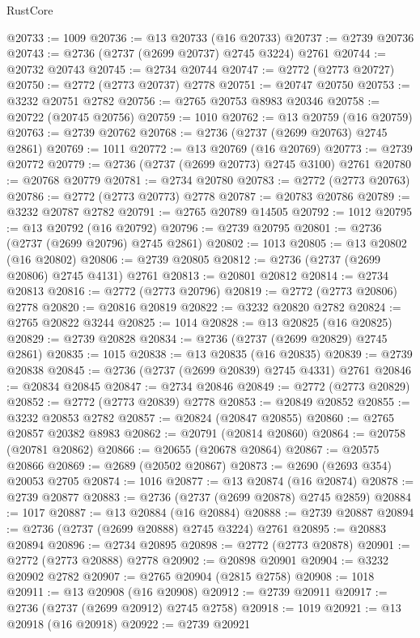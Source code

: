 \begin{lexlean}{RustCore}
\begin{coremodule}
@20733 := 1009
@20736 := @13 @20733 (@16 @20733)
@20737 := @2739 @20736
@20743 := @2736 (@2737 (@2699 @20737) @2745 @3224) @2761
@20744 := @20732 @20743
@20745 := @2734 @20744
@20747 := @2772 (@2773 @20727)
@20750 := @2772 (@2773 @20737) @2778
@20751 := @20747 @20750
@20753 := @3232 @20751 @2782
@20756 := @2765 @20753 @8983 @20346
@20758 := @20722 (@20745 @20756)
@20759 := 1010
@20762 := @13 @20759 (@16 @20759)
@20763 := @2739 @20762
@20768 := @2736 (@2737 (@2699 @20763) @2745 @2861)
@20769 := 1011
@20772 := @13 @20769 (@16 @20769)
@20773 := @2739 @20772
@20779 := @2736 (@2737 (@2699 @20773) @2745 @3100) @2761
@20780 := @20768 @20779
@20781 := @2734 @20780
@20783 := @2772 (@2773 @20763)
@20786 := @2772 (@2773 @20773) @2778
@20787 := @20783 @20786
@20789 := @3232 @20787 @2782
@20791 := @2765 @20789 @14505
@20792 := 1012
@20795 := @13 @20792 (@16 @20792)
@20796 := @2739 @20795
@20801 := @2736 (@2737 (@2699 @20796) @2745 @2861)
@20802 := 1013
@20805 := @13 @20802 (@16 @20802)
@20806 := @2739 @20805
@20812 := @2736 (@2737 (@2699 @20806) @2745 @4131) @2761
@20813 := @20801 @20812
@20814 := @2734 @20813
@20816 := @2772 (@2773 @20796)
@20819 := @2772 (@2773 @20806) @2778
@20820 := @20816 @20819
@20822 := @3232 @20820 @2782
@20824 := @2765 @20822 @3244
@20825 := 1014
@20828 := @13 @20825 (@16 @20825)
@20829 := @2739 @20828
@20834 := @2736 (@2737 (@2699 @20829) @2745 @2861)
@20835 := 1015
@20838 := @13 @20835 (@16 @20835)
@20839 := @2739 @20838
@20845 := @2736 (@2737 (@2699 @20839) @2745 @4331) @2761
@20846 := @20834 @20845
@20847 := @2734 @20846
@20849 := @2772 (@2773 @20829)
@20852 := @2772 (@2773 @20839) @2778
@20853 := @20849 @20852
@20855 := @3232 @20853 @2782
@20857 := @20824 (@20847 @20855)
@20860 := @2765 @20857 @20382 @8983
@20862 := @20791 (@20814 @20860)
@20864 := @20758 (@20781 @20862)
@20866 := @20655 (@20678 @20864)
@20867 := @20575 @20866
@20869 := @2689 (@20502 @20867)
@20873 := @2690 (@2693 @354) @20053 @2705
@20874 := 1016
@20877 := @13 @20874 (@16 @20874)
@20878 := @2739 @20877
@20883 := @2736 (@2737 (@2699 @20878) @2745 @2859)
@20884 := 1017
@20887 := @13 @20884 (@16 @20884)
@20888 := @2739 @20887
@20894 := @2736 (@2737 (@2699 @20888) @2745 @3224) @2761
@20895 := @20883 @20894
@20896 := @2734 @20895
@20898 := @2772 (@2773 @20878)
@20901 := @2772 (@2773 @20888) @2778
@20902 := @20898 @20901
@20904 := @3232 @20902 @2782
@20907 := @2765 @20904 (@2815 @2758)
@20908 := 1018
@20911 := @13 @20908 (@16 @20908)
@20912 := @2739 @20911
@20917 := @2736 (@2737 (@2699 @20912) @2745 @2758)
@20918 := 1019
@20921 := @13 @20918 (@16 @20918)
@20922 := @2739 @20921

\end{coremodule}
\end{lexlean}
